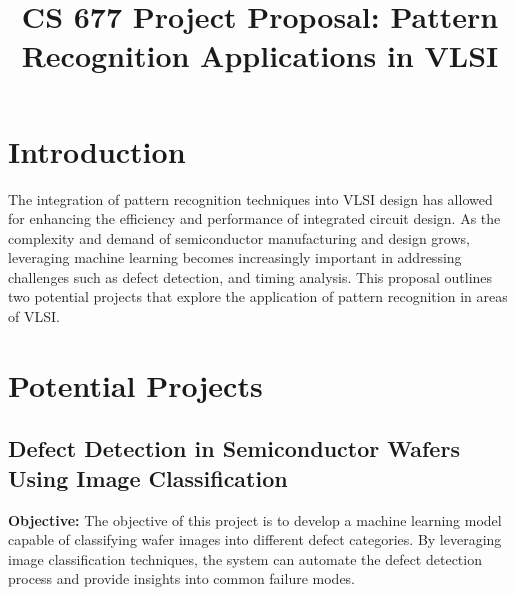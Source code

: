 \documentclass[conference]{IEEEtran}
\begin{document}
\title{
    CS 677 Project Proposal: Pattern Recognition Applications in VLSI
}

\author{
}

\maketitle

\section{Introduction}
The integration of pattern recognition techniques into VLSI design has allowed for enhancing the efficiency and performance of integrated circuit design. 
As the complexity and demand of semiconductor manufacturing and design grows, leveraging machine learning becomes increasingly important in addressing challenges such as defect detection, and timing analysis. 
This proposal outlines two potential projects that explore the application of pattern recognition in areas of VLSI.

\section{Potential Projects}
\subsection{Defect Detection in Semiconductor Wafers Using Image Classification}
\textbf{Objective:} The objective of this project is to develop a machine learning model capable of classifying wafer images into different defect categories. By leveraging image classification techniques, the system can automate the defect detection process and provide insights into common failure modes.
\end{document}
